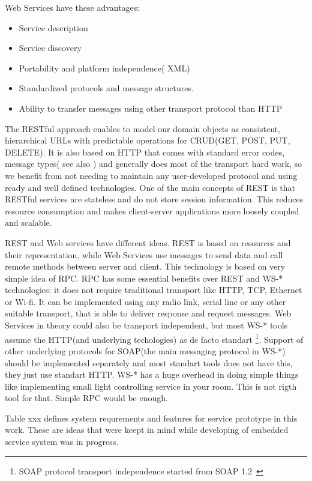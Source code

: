 Web Services have these advantages:
\begin{itemize}
  \item Service description
  \item Service discovery
  \item Portability and platform independence( XML)
  \item Standardized protocols and message structures.
  \item Ability to transfer messages using other transport protocol than HTTP
\end{itemize}

The RESTful approach enables to model our domain objects as
consistent, hierarchical URLs with predictable operations for \gls{CRUD}(GET,
POST, PUT, DELETE). It is also based on HTTP that comes with standard error
codes, message types( see also ) and
generally does most of the transport hard work, so we benefit from not
needing to maintain any user-developed protocol and using ready and well defined
technologies. One of the main concepts of REST is that RESTful services are
stateless and do not store session information. This reduces
resource consumption and makes client-server applications more loosely coupled
and scalable.

REST and Web services have different ideas. REST is based on resources and their
representation, while Web Services use messages to send data and call remote
methods between server and client. This technology is based on very simple idea
of \gls{RPC}. RPC has some essential benefits over REST and
WS-* technologies: it does not require traditional transport like HTTP, TCP,
Ethernet or Wi-fi. It can be implemented using any radio link, serial line or
any other suitable transport, that is able to deliver response and request
messages. Web Services in theory could also be transport independent, but most
WS-* tools assume the HTTP(and underlying techologies) as de facto standart
\footnote{SOAP protocol transport independence started from SOAP
1.2~\cite{soap_protocol_spec}}. Support of other underlying protocols for
SOAP(the main messaging protocol in WS-*) should be implemented separately and
most standart tools does not have this, they just use standart HTTP. WS-* has a
huge overhead in doing simple things like implementing small light
controlling service in your room. This is not rigth tool for that. Simple RPC
would be enough.

Table xxx defines system requrements and features for service prototype in this
work. These are ideas that were keept in mind while developing of embedded
service system was in progress.

